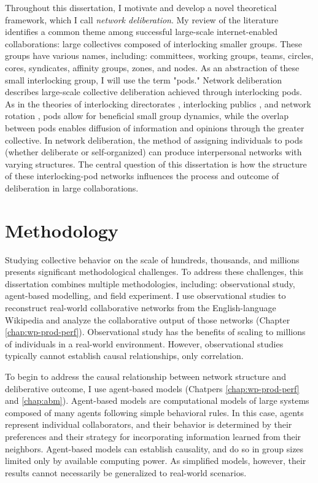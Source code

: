 Throughout this dissertation,
I motivate and develop a novel theoretical framework,
which I call {\em network deliberation}.
My review of the literature identifies a common theme
among successful large-scale internet-enabled collaborations:
large collectives composed of interlocking smaller groups.
These groups have various names, including:
committees, working groups, teams, circles, cores, syndicates,
affinity groups, zones, and nodes.
As an abstraction of these small interlocking group, I will use the term "pods."
Network deliberation describes large-scale collective deliberation achieved
through interlocking pods.
As in the theories of interlocking directorates \cite{levine_study_1979},
interlocking publics \cite{habermas_structural_1991},
and network rotation \cite{salehi_hive_2018},
pods allow for beneficial small group dynamics,
while the overlap between pods enables diffusion of information and opinions
through the greater collective.
In network deliberation, the method of assigning individuals to pods
(whether deliberate or self-organized) can produce interpersonal networks with
varying structures.
The central question of this dissertation is how the structure of these
interlocking-pod networks influences the process and outcome of deliberation
in large collaborations.

\section{Methodology}

Studying collective behavior on the scale of hundreds, thousands, and millions
presents significant methodological challenges.
To address these challenges, this dissertation combines multiple methodologies,
including: observational study, agent-based modelling, and field experiment.
I use observational studies to reconstruct real-world collaborative networks
from the English-language Wikipedia and analyze the collaborative output of
those networks (Chapter \ref{chap:wp-prod-perf}).
Observational study has the benefits of scaling to millions of individuals
in a real-world environment.
However, observational studies typically cannot establish causal relationships,
only correlation.

To begin to address the causal relationship between network structure and
deliberative outcome, I use agent-based models
(Chatpers \ref{chap:wp-prod-perf} and \ref{chap:abm}).
Agent-based models are computational models of large systems composed of
many agents following simple behavioral rules.
In this case, agents represent individual collaborators,
and their behavior is determined by their preferences and their strategy for
incorporating information learned from their neighbors.
Agent-based models can establish causality,
and do so in group sizes limited only by available computing power.
As simplified models, however, their results cannot necessarily be generalized
to real-world scenarios.

